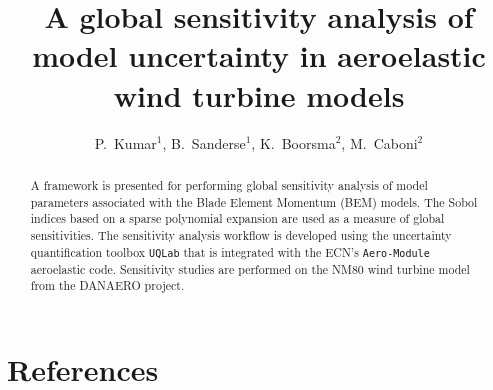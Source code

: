 \documentclass[a4paper]{jpconf}
\newcommand{\myreferences}{../references,../Mendeley_refs}
\numberwithin{equation}{section}
\begin{document}



\title{A global sensitivity analysis of model uncertainty in aeroelastic wind turbine models}


\author{P.~Kumar$^{1}$, B.~Sanderse$^{1}$, K.~Boorsma$ ^{2}$, M.~Caboni$^{2}$} 
\address{$^{1}$ Centrum Wiskunde \& Informatica (CWI), Amsterdam, The Netherlands}
\address{$^{2}$ TNO, Westerduinweg 3, Petten, The Netherlands}


\begin{abstract}
A framework is presented for performing global sensitivity analysis of model parameters associated with the Blade Element Momentum (BEM) models. The Sobol indices based on a sparse polynomial  expansion are used as a measure of global sensitivities. The sensitivity analysis workflow is developed using the uncertainty quantification toolbox \texttt{UQLab} that is integrated with the ECN's \texttt{Aero-Module} aeroelastic code. Sensitivity studies are performed on the NM80 wind turbine model from the DANAERO project.
\end{abstract}

\vspace{-1cm}





\section*{References}



%
\end{document}
